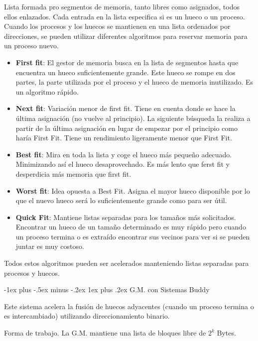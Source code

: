 \documentclass[10pt,portrait, twocolumn]{article}
\makeatletter
\renewcommand{\subsubsection}{\@startsection{subsubsection}{3}{0mm}%
                                {-1ex plus -.5ex minus -.2ex}%
                                {1ex plus .2ex}%
                                {\normalfont\small\bfseries}}
\makeatother
\begin{document}
Lista formada pro segmentos de memoria, tanto libres como asignados, todos ellos enlazados. Cada entrada en la lista especifica si es un hueco o un proceso.\\

Cuando los procesos y los huecos se mantienen en una lista ordenados por direcciones, se pueden utilizar diferentes algoritmos para reservar memoria para un proceso nuevo.

	\begin{itemize}
	\item \textbf{First fit}: El gestor de memoria busca en la lista de segmentos hasta que encuentra un hueco suficientemente grande. Este hueco se rompe en dos partes, la parte utilizada por el proceso y el hueco de memoria inutilizado. Es un algoritmo rápido.
	\item \textbf{Next fit}: Variación menor de first fit. Tiene en cuenta donde se hace la última asignación (no vuelve al principio). La siguiente búsqueda la realiza a partir de la última asignación en lugar de empezar por el principio como haría First Fit. Tiene un rendimiento ligeramente menor que First Fit.
	\item \textbf{Best fit}: Mira en toda la lista y coge el hueco más pequeño adecuado. Minimizando así el hueco desaprovechado. Es más lento que ferst fit y desperdicia más memoria que first fit.
	\item \textbf{Worst fit}: Idea opuesta a Best Fit. Asigna el mayor hueco disponible por lo que el nuevo hueco será lo suficientemente grande como para ser útil.
	\item \textbf{Quick Fit}: Mantiene listas separadas para los tamaños más solicitados. Encontrar un hueco de un tamaño determinado es muy rápido pero cuando un proceso termina o es extraído encontrar sus vecinos para ver si se pueden juntar es muy costoso.
	\end{itemize}
	
Todos estos algoritmos pueden ser acelerados manteniendo listas separadas para procesos y huecos.
	
\subsubsection{G.M. con Sistemas Buddy}

Este sistema acelera la fusión de huecos adyacentes (cuando un proceso termina o es intercambiado) utilizando direccionamiento binario.

\quad Forma de trabajo. La G.M. mantiene una lista de bloques libre de $2^{k}$ Bytes.
\end{document}
